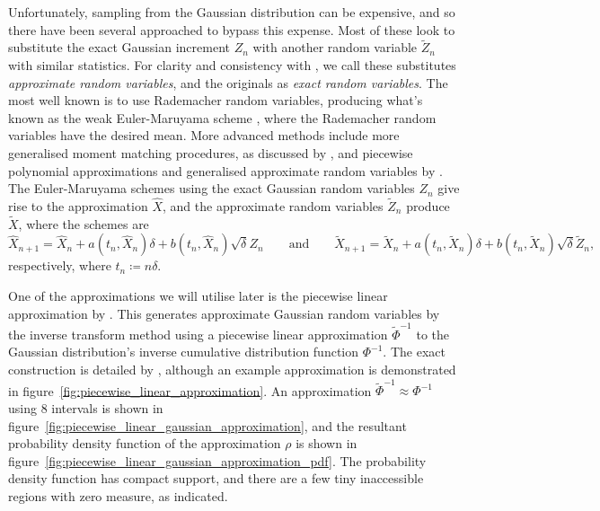 \documentclass[manuscript,review]{acmart}
\begin{document}
Unfortunately, sampling from the Gaussian distribution can be expensive, and so there have been several approached to bypass this expense. Most of these look to substitute the exact Gaussian increment $ Z_n $ with another random variable $ \widetilde{Z}_n $ with similar statistics. For clarity and consistency with \citeauthor{giles2020approximate} \citep{giles2020approximate,sheridan2020approximate_inverse,giles2020approximating}, we call these substitutes \emph{approximate random variables}, and the originals as \emph{exact random variables}. The most well known is to use Rademacher random variables, producing what's known as the weak Euler-Maruyama scheme \citep[page~XXXII]{kloeden1999numerical}, where the Rademacher random variables have the desired mean. More advanced methods include more generalised moment matching procedures, as discussed by \citet{muller1958inverse}, and piecewise polynomial approximations and generalised approximate random variables by \citeauthor{giles2020approximate} \citep{giles2020approximate,sheridan2020approximate_inverse}. The Euler-Maruyama schemes using the exact Gaussian random variables $ Z_n $ give rise to the approximation $ \widehat{X} $, and the approximate random variables $ \widetilde{Z}_n $ produce $ \widetilde{X} $, where the schemes are 
\begin{equation*}
\widehat{X}_{n+1} = \widehat{X}_n + a(t_n, \widehat{X}_n) \delta + b(t_n, \widehat{X}_n)\sqrt{\delta} Z_n
\qquad \text{and} \qquad 
\widetilde{X}_{n+1} = \widetilde{X}_n + a(t_n, \widetilde{X}_n) \delta + b(t_n, \widetilde{X}_n)\sqrt{\delta} \widetilde{Z}_n,
\end{equation*}
respectively, where $ t_n \coloneqq n \delta $. 

One of the approximations we will utilise later is the piecewise linear approximation by \citet{giles2020approximating}. This generates approximate Gaussian random variables by the inverse transform method \citep{glasserman2013monte} using a piecewise linear approximation $ \widetilde{\Phi}^{-1} $ to the Gaussian distribution's inverse cumulative distribution function $ \Phi^{-1} $. The exact construction is detailed by \citet{giles2020approximating}, although an example approximation is demonstrated in figure~\ref{fig:piecewise_linear_approximation}. An approximation $ \widetilde{\Phi}^{-1} \approx \Phi^{-1} $ using 8 intervals is shown in figure~\ref{fig:piecewise_linear_gaussian_approximation}, and the resultant probability density function of the approximation $ \rho $ is shown in figure~\ref{fig:piecewise_linear_gaussian_approximation_pdf}. The probability density function has compact support, and there are a few tiny inaccessible regions with zero measure, as indicated. 
\end{document}
